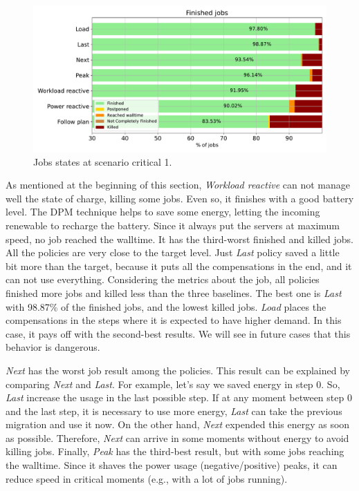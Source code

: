 \begin{figure}[!htb]
    \centering
    \includegraphics[scale=0.55]{Images/Compensations/jobs_critical_1.pdf}
    \caption{Jobs states at scenario critical 1.}
    \label{fig:jobs_critical_1}
\end{figure}

As mentioned at the beginning of this section, \emph{Workload reactive} can not manage well the state of charge, killing some jobs. Even so, it finishes with a good battery level. The DPM technique helps to save some energy, letting the incoming renewable to recharge the battery. Since it always put the servers at maximum speed, no job reached the walltime. It has the third-worst finished and killed jobs. All the policies are very close to the target level. Just \emph{Last} policy saved a little bit more than the target, because it puts all the compensations in the end, and it can not use everything. Considering the metrics about the job, all policies finished more jobs and killed less than the three baselines. The best one is \emph{Last} with 98.87\% of the finished jobs, and the lowest killed jobs. \emph{Load} places the compensations in the steps where it is expected to have higher demand. In this case, it pays off with the second-best results. We will see in future cases that this behavior is dangerous. 

\emph{Next} has the worst job result among the policies. This result can be explained by comparing \emph{Next} and \emph{Last}. For example, let's say we saved energy in step 0. So, \emph{Last} increase the usage in the last possible step. If at any moment between step 0 and the last step, it is necessary to use more energy, \emph{Last} can take the previous migration and use it now. On the other hand, \emph{Next} expended this energy as soon as possible. Therefore, \emph{Next} can arrive in some moments without energy to avoid killing jobs. Finally, \emph{Peak} has the third-best result, but with some jobs reaching the walltime. Since it shaves the power usage (negative/positive) peaks, it can reduce speed in critical moments (e.g., with a lot of jobs running). 


